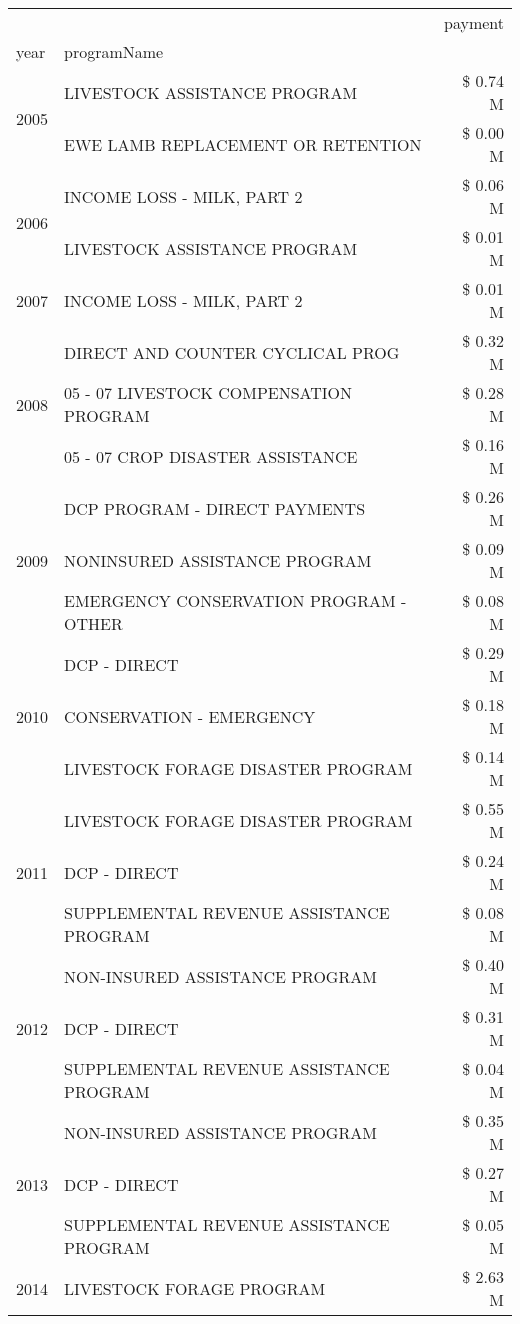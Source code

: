 \begin{tabular}{llr}
\toprule
 &  & payment \\
year & programName &  \\
\midrule
\multirow[t]{2}{*}{2005} & LIVESTOCK ASSISTANCE PROGRAM & \$ 0.74 M \\
 & EWE LAMB REPLACEMENT OR RETENTION & \$ 0.00 M \\
\cline{1-3}
\multirow[t]{2}{*}{2006} & INCOME LOSS - MILK, PART 2 & \$ 0.06 M \\
 & LIVESTOCK ASSISTANCE PROGRAM & \$ 0.01 M \\
\cline{1-3}
2007 & INCOME LOSS - MILK, PART 2 & \$ 0.01 M \\
\cline{1-3}
\multirow[t]{3}{*}{2008} & DIRECT AND COUNTER CYCLICAL PROG & \$ 0.32 M \\
 & 05 - 07 LIVESTOCK COMPENSATION PROGRAM & \$ 0.28 M \\
 & 05 - 07 CROP DISASTER ASSISTANCE & \$ 0.16 M \\
\cline{1-3}
\multirow[t]{3}{*}{2009} & DCP PROGRAM - DIRECT PAYMENTS & \$ 0.26 M \\
 & NONINSURED ASSISTANCE PROGRAM & \$ 0.09 M \\
 & EMERGENCY CONSERVATION PROGRAM - OTHER & \$ 0.08 M \\
\cline{1-3}
\multirow[t]{3}{*}{2010} & DCP - DIRECT & \$ 0.29 M \\
 & CONSERVATION - EMERGENCY & \$ 0.18 M \\
 & LIVESTOCK FORAGE DISASTER PROGRAM & \$ 0.14 M \\
\cline{1-3}
\multirow[t]{3}{*}{2011} & LIVESTOCK FORAGE DISASTER PROGRAM & \$ 0.55 M \\
 & DCP - DIRECT & \$ 0.24 M \\
 & SUPPLEMENTAL REVENUE ASSISTANCE PROGRAM & \$ 0.08 M \\
\cline{1-3}
\multirow[t]{3}{*}{2012} & NON-INSURED ASSISTANCE PROGRAM & \$ 0.40 M \\
 & DCP - DIRECT & \$ 0.31 M \\
 & SUPPLEMENTAL REVENUE ASSISTANCE PROGRAM & \$ 0.04 M \\
\cline{1-3}
\multirow[t]{3}{*}{2013} & NON-INSURED ASSISTANCE PROGRAM & \$ 0.35 M \\
 & DCP - DIRECT & \$ 0.27 M \\
 & SUPPLEMENTAL REVENUE ASSISTANCE PROGRAM & \$ 0.05 M \\
\cline{1-3}
\multirow[t]{3}{*}{2014} & LIVESTOCK FORAGE PROGRAM & \$ 2.63 M \\

\end{tabular}
